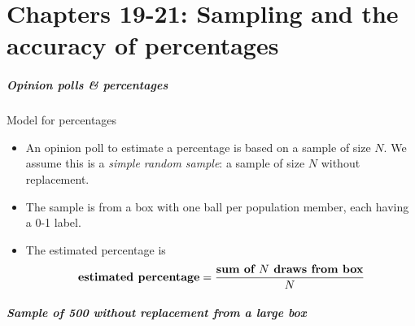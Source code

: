 \documentclass[handout]{beamer}
\begin{document}
   \part{Chapters 19-21: Sampling and the accuracy of percentages}
   \frame{\partpage}


   \begin{frame} \frametitle{Opinion polls \& percentages}

   \begin{block}
   {Model for percentages}
   \begin{itemize}
   \item An opinion poll to estimate a percentage
   is based on a sample of size $N$. We assume this is
   a {\em simple random sample}: a sample of size $N$ without replacement.

   \item The sample is from a box with one ball per population member,
   each having a 0-1 label.

   \item The estimated percentage is
   $$
   \text{\bf estimated percentage} = \frac{\text{\bf sum of $N$ draws from box}}{N}
   $$
   \end{itemize}
   \end{block}
   \end{frame}



   \begin{frame}
   \frametitle{Sample of 500 without replacement from a large box}
   \begin{center}
   \end{center}

   \end{frame}
\end{document}
